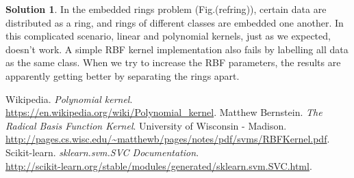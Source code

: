 \documentclass[a4paper,UTF8]{article}
\numberwithin{equation}{section}
\theoremstyle{definition}
\newtheorem*{solution}{Solution}
\begin{document}
\begin{solution}
In the embedded rings problem (Fig.(ref{ring})), certain data are distributed as a ring, and rings of different classes are embedded one another. In this complicated scenario, linear and polynomial kernels, just as we expected, doesn't work. A simple RBF kernel implementation also fails by labelling all data as the same class. When we try to increase the RBF parameters, the results are apparently getting better by separating the rings apart.

\end{solution}

\begin{thebibliography}{99}
 Wikipedia. \textit{Polynomial kernel}. \\\url{https://en.wikipedia.org/wiki/Polynomial_kernel}.
 Matthew Bernstein. \textit{The Radical Basis Function Kernel}. University of Wisconsin - Madison. \url{http://pages.cs.wisc.edu/~matthewb/pages/notes/pdf/svms/RBFKernel.pdf}.
 Scikit-learn. \textit{sklearn.svm.SVC Documentation}. \\
\url{http://scikit-learn.org/stable/modules/generated/sklearn.svm.SVC.html}.
\end{thebibliography}
\end{document}
